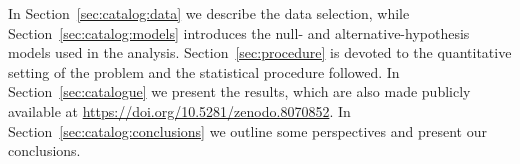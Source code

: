 In Section~\ref{sec:catalog:data} we describe the data selection, while Section~\ref{sec:catalog:models} introduces the null- and alternative-hypothesis models used in the analysis.  Section~\ref{sec:procedure} is devoted to the quantitative setting of the problem and the statistical procedure followed. In Section~\ref{sec:catalogue} we present the results, which are also  made publicly available at \href{https://doi.org/10.5281/zenodo.8070852}{https://doi.org/10.5281/zenodo.8070852}. In Section~\ref{sec:catalog:conclusions} we outline some perspectives and present our conclusions.  


